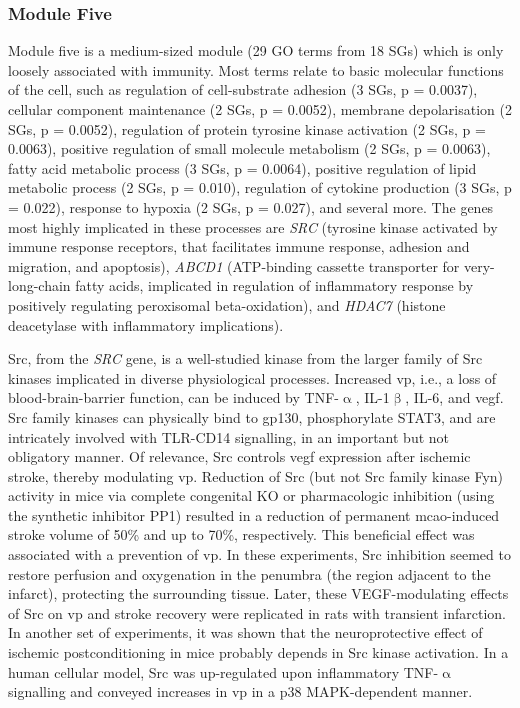 \subsubsection{Module Five}
Module five is a medium-sized module (29 GO terms from 18 SGs) which is only loosely associated with immunity. Most terms relate to basic molecular functions of the cell, such as regulation of cell-substrate adhesion (3 SGs, p = 0.0037), cellular component maintenance (2 SGs, p = 0.0052), membrane depolarisation (2 SGs, p = 0.0052), regulation of protein tyrosine kinase activation (2 SGs, p = 0.0063), positive regulation of small molecule metabolism (2 SGs, p = 0.0063), fatty acid metabolic process (3 SGs, p = 0.0064), positive regulation of lipid metabolic process (2 SGs, p = 0.010), regulation of cytokine production (3 SGs, p = 0.022), response to hypoxia (2 SGs, p = 0.027), and several more. The genes most highly implicated in these processes are \emph{SRC} (tyrosine kinase activated by immune response receptors, that facilitates immune response, adhesion and migration, and apoptosis), \emph{ABCD1} (ATP-binding cassette transporter for very-long-chain fatty acids, implicated in regulation of inflammatory response by positively regulating peroxisomal beta-oxidation), and \emph{HDAC7} (histone deacetylase with inflammatory implications).

Src, from the \emph{SRC} gene, is a well-studied kinase from the larger family of Src kinases implicated in diverse physiological processes. Increased \acf{vp}, i.e., a loss of blood-brain-barrier function, can be induced by TNF-$\upalpha$, IL-1$\upbeta$, IL-6, and \ac{vegf}. Src family kinases can physically bind to gp130, phosphorylate STAT3,\cite{Brown1996} and are intricately involved with TLR-CD14 signalling, in an important but not obligatory manner.\cite{Okutani2006} Of relevance, Src controls \ac{vegf} expression after ischemic stroke, thereby modulating \ac{vp}. Reduction of Src (but not Src family kinase Fyn) activity in mice via complete congenital KO or pharmacologic inhibition (using the synthetic inhibitor PP1) resulted in a reduction of permanent \ac{mcao}-induced stroke volume of 50\% and up to 70\%, respectively. This beneficial effect was associated with a prevention of \ac{vp}.\cite{Paul2001} In these experiments, Src inhibition seemed to restore perfusion and oxygenation in the penumbra (the region adjacent to the infarct), protecting the surrounding tissue. Later, these VEGF-modulating effects of Src on \ac{vp} and stroke recovery were replicated in rats with transient infarction.\cite{Zan2014} In another set of experiments, it was shown that the neuroprotective effect of ischemic postconditioning in mice probably depends in Src kinase activation.\cite{Kumar2014b} In a human cellular model, Src was up-regulated upon inflammatory TNF-$\upalpha$ signalling and conveyed increases in \ac{vp} in a p38 MAPK-dependent manner.\cite{Adam2016} 


